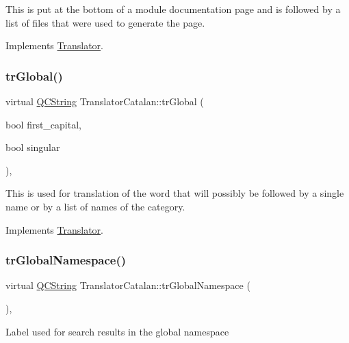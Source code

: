 This is put at the bottom of a module documentation page and is followed by a list of files that were used to generate the page. 

Implements \mbox{\hyperlink{class_translator}{Translator}}.

\mbox{\label{class_translator_catalan_a99dd80d92674e95f0cfcd1b114731ffa}} 
\subsubsection{\texorpdfstring{trGlobal()}{trGlobal()}}
{\footnotesize\ttfamily virtual \mbox{\hyperlink{class_q_c_string}{Q\+C\+String}} Translator\+Catalan\+::tr\+Global (\begin{DoxyParamCaption}\item[{bool}]{first\+\_\+capital,  }\item[{bool}]{singular }\end{DoxyParamCaption})\hspace{0.3cm}{\ttfamily [inline]}, {\ttfamily [virtual]}}

This is used for translation of the word that will possibly be followed by a single name or by a list of names of the category. 

Implements \mbox{\hyperlink{class_translator}{Translator}}.

\mbox{\label{class_translator_catalan_aba4ea5c0dff73774f25cb24a416e4bda}} 
\subsubsection{\texorpdfstring{trGlobalNamespace()}{trGlobalNamespace()}}
{\footnotesize\ttfamily virtual \mbox{\hyperlink{class_q_c_string}{Q\+C\+String}} Translator\+Catalan\+::tr\+Global\+Namespace (\begin{DoxyParamCaption}{ }\end{DoxyParamCaption})\hspace{0.3cm}{\ttfamily [inline]}, {\ttfamily [virtual]}}

Label used for search results in the global namespace 

